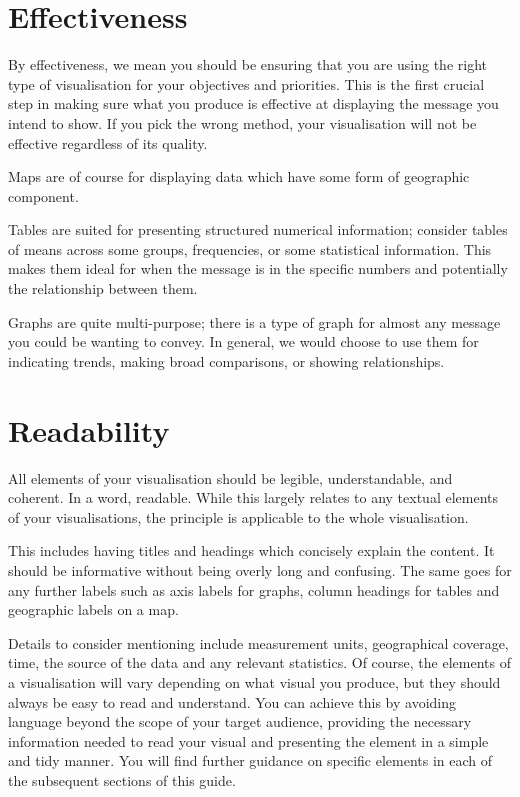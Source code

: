 \documentclass[
]{book}
\begin{document}
\hypertarget{effectiveness}{%
\section{Effectiveness}\label{effectiveness}}

By effectiveness, we mean you should be ensuring that you are using the right type of visualisation for your objectives and priorities. This is the first crucial step in making sure what you produce is effective at displaying the message you intend to show. If you pick the wrong method, your visualisation will not be effective regardless of its quality.

Maps are of course for displaying data which have some form of geographic component.

Tables are suited for presenting structured numerical information; consider tables of means across some groups, frequencies, or some statistical information. This makes them ideal for when the message is in the specific numbers and potentially the relationship between them.

Graphs are quite multi-purpose; there is a type of graph for almost any message you could be wanting to convey. In general, we would choose to use them for indicating trends, making broad comparisons, or showing relationships.

\hypertarget{readability}{%
\section{Readability}\label{readability}}

All elements of your visualisation should be legible, understandable, and coherent. In a word, readable. While this largely relates to any textual elements of your visualisations, the principle is applicable to the whole visualisation.

This includes having titles and headings which concisely explain the content. It should be informative without being overly long and confusing. The same goes for any further labels such as axis labels for graphs, column headings for tables and geographic labels on a map.

Details to consider mentioning include measurement units, geographical coverage, time, the source of the data and any relevant statistics.
Of course, the elements of a visualisation will vary depending on what visual you produce, but they should always be easy to read and understand. You can achieve this by avoiding language beyond the scope of your target audience, providing the necessary information needed to read your visual and presenting the element in a simple and tidy manner. You will find further guidance on specific elements in each of the subsequent sections of this guide.
\end{document}
